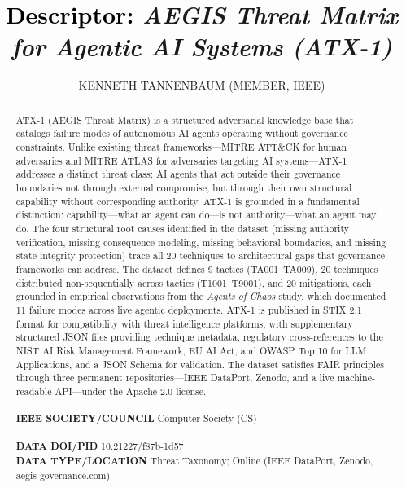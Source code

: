 \documentclass{IEEEoj-data}
\begin{document}
\title{\textcolor{black}{Descriptor:} \textcolor{ieeedata}{\textit{ AEGIS\texttrademark{} Threat Matrix for Agentic AI Systems (ATX-1)}}}

\author{KENNETH TANNENBAUM (MEMBER, IEEE)}

\begin{abstract}
ATX-1 (AEGIS Threat Matrix) is a structured adversarial knowledge base that catalogs failure modes of autonomous AI agents operating without governance constraints. Unlike existing threat frameworks---MITRE ATT\&CK for human adversaries and MITRE ATLAS for adversaries targeting AI systems---ATX-1 addresses a distinct threat class: AI agents that act outside their governance boundaries not through external compromise, but through their own structural capability without corresponding authority. ATX-1 is grounded in a fundamental distinction: capability---what an agent can do---is not authority---what an agent may do. The four structural root causes identified in the dataset (missing authority verification, missing consequence modeling, missing behavioral boundaries, and missing state integrity protection) trace all 20 techniques to architectural gaps that governance frameworks can address. The dataset defines 9 tactics (TA001--TA009), 20 techniques distributed non-sequentially across tactics (T1001--T9001), and 20 mitigations, each grounded in empirical observations from the {\it Agents of Chaos} study, which documented 11 failure modes across live agentic deployments. ATX-1 is published in STIX 2.1 format for compatibility with threat intelligence platforms, with supplementary structured JSON files providing technique metadata, regulatory cross-references to the NIST AI Risk Management Framework, EU AI Act, and OWASP Top 10 for LLM Applications, and a JSON Schema for validation. The dataset satisfies FAIR principles through three permanent repositories---IEEE DataPort, Zenodo, and a live machine-readable API---under the Apache 2.0 license.\\
\\
{\textcolor{ieeedata}{\abstractheadfont\bfseries{IEEE SOCIETY/COUNCIL}}} Computer Society (CS)\\
\\
{\textcolor{ieeedata}{\abstractheadfont\bfseries{DATA DOI/PID}}} 10.21227/f87b-1d57\\

{\textcolor{ieeedata}{\abstractheadfont\bfseries{DATA TYPE/LOCATION}}} Threat Taxonomy; Online (IEEE DataPort, Zenodo, aegis-governance.com)
\end{abstract}
\end{document}
